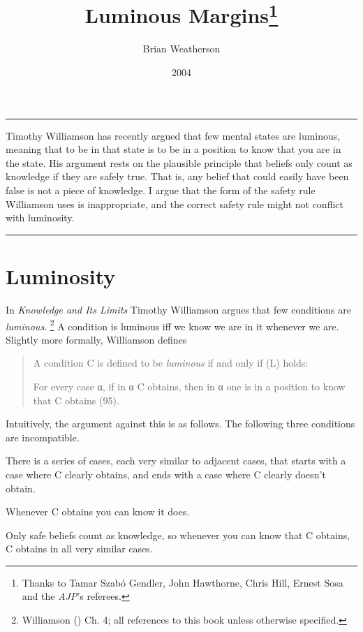 \documentclass[
  10pt,
  letterpaper,
  DIV=11,
  numbers=noendperiod,
  twoside]{scrartcl}
\title{Luminous Margins\thanks{Thanks to Tamar Szabó Gendler, John
Hawthorne, Chris Hill, Ernest Sosa and the \emph{AJP}'s referees.}}
\author{Brian Weatherson}
\date{2004}
\providecommand{\tightlist}{%
  \setlength{\itemsep}{0pt}\setlength{\parskip}{0pt}}\usepackage{longtable,booktabs,array}
\renewenvironment{abstract}
 {\vspace{-1.25cm}
 \quotation\small\noindent\rule{\linewidth}{.5pt}\par\smallskip
 \noindent }
 {\par\noindent\rule{\linewidth}{.5pt}\endquotation}
\begin{document}
\maketitle
\begin{abstract}
Timothy Williamson has recently argued that few mental states are
luminous, meaning that to be in that state is to be in a position to
know that you are in the state. His argument rests on the plausible
principle that beliefs only count as knowledge if they are safely true.
That is, any belief that could easily have been false is not a piece of
knowledge. I argue that the form of the safety rule Williamson uses is
inappropriate, and the correct safety rule might not conflict with
luminosity.
\end{abstract}

\section{Luminosity}\label{luminosity}

In \emph{Knowledge and Its Limits} Timothy Williamson argues that few
conditions are \emph{luminous}. \footnote{Williamson
  () Ch. 4; all references to
  this book unless otherwise specified.} A condition is luminous iff we
know we are in it whenever we are. Slightly more formally, Williamson
defines

\begin{quote}
A condition C is defined to be \emph{luminous} if and only if (L) holds:

\begin{description}
\tightlist
\item[(L)]
For every case α, if in α C obtains, then in α one is in a position to
know that C obtains (95).
\end{description}
\end{quote}

Intuitively, the argument against this is as follows. The following
three conditions are incompatible.

\begin{description}
\tightlist
\item[Gradual Change]
There is a series of cases, each very similar to adjacent cases, that
starts with a case where C clearly obtains, and ends with a case where C
clearly doesn't obtain.
\item[Luminosity]
Whenever C obtains you can know it does.
\item[Safety]
Only safe beliefs count as knowledge, so whenever you can know that C
obtains, C obtains in all very similar cases.
\end{description}
\end{document}
